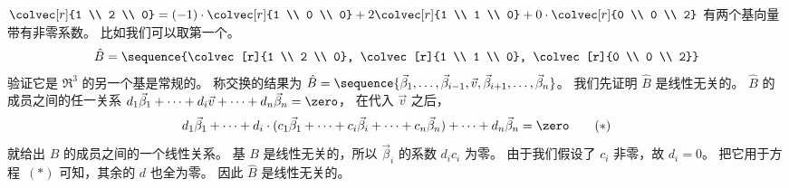       \begin{answer}
      \begin{exparts}
        \partsitem
          $\colvec[r]{1 \\ 2 \\ 0}
             =(-1)\cdot\colvec[r]{1 \\ 0  \\ 0}
              +2\colvec[r]{1 \\ 1 \\ 0}
              +0\cdot\colvec[r]{0 \\ 0 \\ 2}$
         \partsitem 有两个基向量带有非零系数。
            比如我们可以取第一个。
            \begin{equation*}
              \hat{B}=\sequence{\colvec[r]{1 \\ 2  \\ 0},
                \colvec[r]{1 \\ 1 \\ 0},
                \colvec[r]{0 \\ 0 \\ 2}}
            \end{equation*}
            验证它是 \( \Re^3 \) 的另一个基是常规的。
         \partsitem  
          称交换的结果为
          \( \hat{B}=\sequence{\vec{\beta}_1,\dots,\vec{\beta}_{i-1},\vec{v},
            \vec{\beta}_{i+1},\dots,\vec{\beta}_n}  \)。
          我们先证明 $\hat{B}$ 是线性无关的。
          $\hat{B}$ 的成员之间的任一关系
          \( d_1\vec{\beta}_1+\dots+d_i\vec{v}+\dots+d_n\vec{\beta}_n=\zero \)，
          在代入 $\vec{v}$ 之后，
          \begin{equation*}
          d_1\vec{\beta}_1+\dots
          +d_i\cdot(c_1\vec{\beta}_1+\dots+c_i\vec{\beta}_i+\dots+c_n\vec{\beta}_n)
          +\dots+d_n\vec{\beta}_n
          =\zero
          \tag*{($*$)}\end{equation*}
          就给出 $B$ 的成员之间的一个线性关系。
          基 $B$ 是线性无关的，所以 $\vec{\beta}_i$ 的系数 $d_ic_i$ 为零。
          由于我们假设了 $c_i$ 非零，故 $d_i=0$。
          把它用于方程~$(*)$ 可知，其余的 $d$ 也全为零。
          因此 $\hat{B}$ 是线性无关的。


\end{exparts}
\end{answer}
